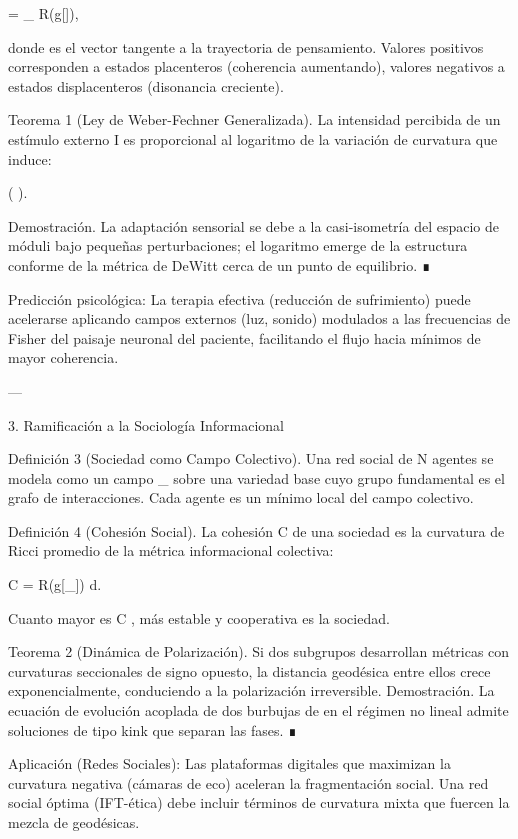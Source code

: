 \documentclass[12pt,twoside]{book}
\begin{document}
 = \nabla_{} R(g[\rho]),

donde    es el vector tangente a la trayectoria de pensamiento. Valores positivos corresponden a estados placenteros (coherencia aumentando), valores negativos a estados displacenteros (disonancia creciente).

Teorema 1 (Ley de Weber-Fechner Generalizada). La intensidad percibida de un estímulo externo  I  es proporcional al logaritmo de la variación de curvatura que induce:

\Delta {} \propto \log\left(  \right).

Demostración. La adaptación sensorial se debe a la casi-isometría del espacio de móduli bajo pequeñas perturbaciones; el logaritmo emerge de la estructura conforme de la métrica de DeWitt cerca de un punto de equilibrio. ∎

Predicción psicológica: La terapia efectiva (reducción de sufrimiento) puede acelerarse aplicando campos externos (luz, sonido) modulados a las frecuencias de Fisher del paisaje neuronal del paciente, facilitando el flujo hacia mínimos de mayor coherencia.

---

3. Ramificación a la Sociología Informacional

Definición 3 (Sociedad como Campo Colectivo). Una red social de  N  agentes se modela como un campo  \rho_{}  sobre una variedad base cuyo grupo fundamental es el grafo de interacciones. Cada agente es un mínimo local del campo colectivo.

Definición 4 (Cohesión Social). La cohesión  C  de una sociedad es la curvatura de Ricci promedio de la métrica informacional colectiva:

C =  \int R(g[\rho_{}]) d.

Cuanto mayor es  C , más estable y cooperativa es la sociedad.

Teorema 2 (Dinámica de Polarización). Si dos subgrupos desarrollan métricas con curvaturas seccionales de signo opuesto, la distancia geodésica entre ellos crece exponencialmente, conduciendo a la polarización irreversible.
Demostración. La ecuación de evolución acoplada de dos burbujas de  \rho  en el régimen no lineal admite soluciones de tipo kink que separan las fases. ∎

Aplicación (Redes Sociales): Las plataformas digitales que maximizan la curvatura negativa (cámaras de eco) aceleran la fragmentación social. Una red social óptima (IFT-ética) debe incluir términos de curvatura mixta que fuercen la mezcla de geodésicas.
\end{document}
